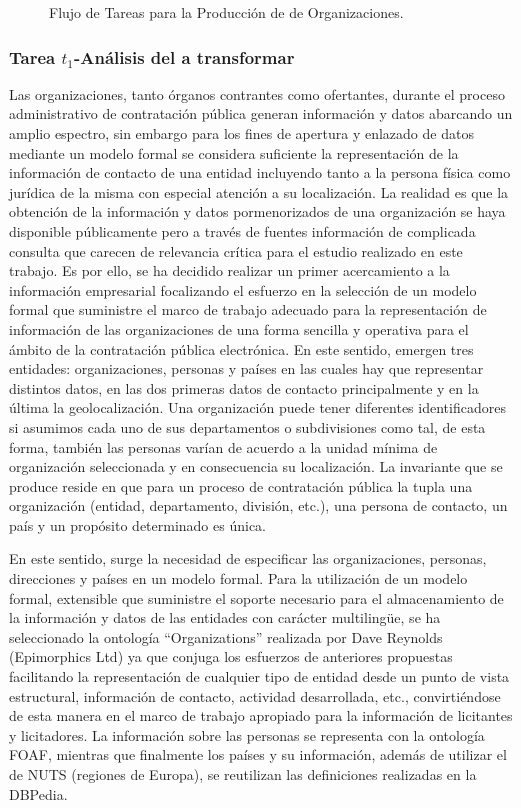 \begin{figure}[!htp]
	\caption{Flujo de Tareas para la Producción de \linkeddata de Organizaciones.}
	\label{fig:produccion-orgs}
\end{figure}

\subsubsection{Tarea $t_1$-Análisis del \dataset a transformar}\label{t1-orgs}
Las organizaciones, tanto órganos contrantes como ofertantes, durante el proceso administrativo de 
contratación pública generan información y datos abarcando un amplio espectro, sin embargo para los fines 
de apertura y enlazado de datos mediante un modelo formal se considera 
suficiente la representación de la información de contacto de una entidad 
incluyendo tanto a la persona física como jurídica de la misma con especial atención a su localización. La realidad 
es que la obtención de la información y datos pormenorizados de una organización se haya disponible públicamente 
pero a través de fuentes información de complicada consulta que 
carecen de relevancia crítica para el estudio realizado en este trabajo. Es por ello, se ha decidido 
realizar un primer acercamiento a la información empresarial focalizando el esfuerzo en la selección 
de un modelo formal que suministre el marco de trabajo adecuado para la representación de información 
de las organizaciones de una forma sencilla y operativa para el ámbito de la contratación pública 
electrónica. En este sentido, emergen tres entidades: organizaciones, personas y países en las cuales 
hay que representar distintos datos, en las dos primeras datos de contacto principalmente y en la última 
la geolocalización. Una organización puede tener diferentes identificadores si asumimos cada uno de sus departamentos o 
subdivisiones como tal, de esta forma, también las personas varían de acuerdo a la unidad mínima de organización seleccionada 
y en consecuencia su localización. La invariante que se produce reside en que para un proceso de contratación pública la tupla 
una organización (entidad, departamento, división, etc.), una persona de contacto, un país y un propósito determinado es única.

En este sentido, surge la necesidad de especificar las organizaciones, personas, direcciones y países en un modelo formal. Para 
la utilización de un modelo formal, extensible que suministre el soporte necesario para el almacenamiento de la información y datos de las entidades con carácter 
multiling\"{u}e, se ha seleccionado la ontología ``Organizations'' realizada por Dave Reynolds (Epimorphics Ltd) ya que conjuga 
los esfuerzos de anteriores propuestas facilitando la representación de cualquier tipo de entidad desde un punto de vista 
estructural, información de contacto, actividad desarrollada, etc., convirtiéndose de esta manera en el marco de trabajo 
apropiado para la información de licitantes y licitadores. La información sobre las personas se representa con la ontología 
FOAF, mientras que finalmente los países y su información, además de utilizar el \dataset de NUTS (regiones de Europa), se reutilizan 
las definiciones realizadas en la DBPedia. 

